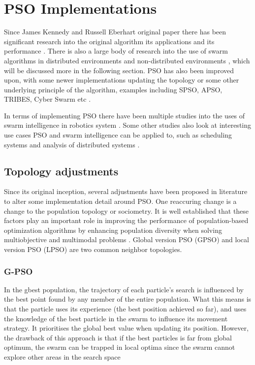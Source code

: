 \documentclass[oneside,12pt]{book}
\begin{document}
\section{PSO Implementations}
Since James Kennedy and Russell Eberhart original paper there has been significant research into the original algorithm \cite{piotrowski_napiorkowski_piotrowska_2020, bai_2010, imrantextordfeminine2013overview, wang_tan_liu_2017} its applications \cite{hereford_2006, beni_2005, blum_li, raquel2005effective} and its performance \cite{yin_yu_wang_wang_2006, kennedy_1999}. There is also a large body of research into the use of swarm algorithms in distributed environments \cite{akat_gazi_2008, salza_ferrucci_2019, peleg_2005} and non-distributed environments \cite{trelea_2003, xie2003overview, poli2007particle}, which will be discussed more in the following section. PSO has also been improved upon, with some newer implementations updating the topology or some other underlying principle of the algorithm, examples including SPSO, APSO, TRIBES, Cyber Swarm etc \cite{zhou2009gpu, oca_stutzle_birattari_dorigo_2009, cooren2009performance, yin2010cyber}.

In terms of implementing PSO there have been multiple studies into the uses of swarm intelligence in robotics system \cite{sa_nedjah_mourelle_2016, meng_gan_2008, hereford_2006}. Some other studies also look at interesting use cases PSO and swarm intelligence can be applied to, such as scheduling systems and analysis of distributed systems \cite{li_yang_su_lu_yu_2019, moradi_fotuhi-firuzabad_2008, nouiri_bekrar_jemai_niar_ammari_2015, sahin2007fault}. 
\subsection{Topology adjustments}
Since its original inception, several adjustments have been proposed in literature to alter some implementation detail around PSO. One reaccuring change is a change to the population topology or sociometry. It is well established that these factors play an important role in improving the performance of population-based optimization algorithms by enhancing population diversity when solving multiobjective and multimodal problems \cite{LYNN201824}. Global version PSO (GPSO) and local version PSO (LPSO) are two common neighbor topologies. 
\subsubsection{G-PSO}
In  the  gbest  population,  the trajectory  of  each  particle’s  search  is  influenced  by  the best point found by any member of the entire population\cite{kennedy2002population}. What this means is that the particle uses its experience (the best position achieved so far), and uses the knowledge of the best particle in the swarm to influence its movement strategy. It prioritises the global best value when updating its position.  However, the drawback of this approach is that if the best particles is far  from global optimum, the  swarm can  be  trapped in  local optima since the swarm cannot explore other areas in the search space \cite{azab_hady_hefny_2016}
\end{document}
